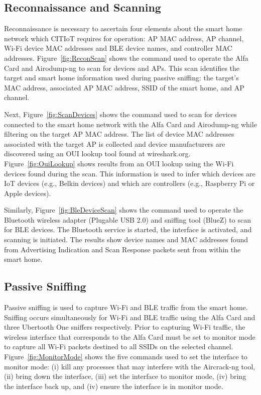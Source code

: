 \documentclass[12pt,letterpaper,oneside]{book}
\begin{document}
		
			\subsection{Reconnaissance and Scanning}
			Reconnaissance is necessary to ascertain four elements about the smart home network which \ac{CITIoT} requires for operation: \ac{AP} \ac{MAC} address, \ac{AP} channel, Wi-Fi device \ac{MAC} addresses and \ac{BLE} device names, and controller \ac{MAC} addresses. Figure~\ref{fig:ReconScan} shows the command used to operate the Alfa Card and Airodump-ng to scan for devices and \ac{AP}s. This scan identifies the target and smart home information used during passive sniffing: the target's \ac{MAC} address, associated \ac{AP} \ac{MAC} address, \ac{SSID} of the smart home, and \ac{AP} channel.
			
			\figReconScan
			
			Next, Figure~\ref{fig:ScanDevices} shows the command used to scan for devices connected to the smart home network with the Alfa Card and Airodump-ng while filtering on the target \ac{AP} \ac{MAC} address. The list of device \ac{MAC} addresses associated with the target \ac{AP} is collected and device manufacturers are discovered using an \ac{OUI} lookup tool found at wireshark.org. Figure~\ref{fig:OuiLookup} shows results from an \ac{OUI} lookup using the Wi-Fi devices found during the scan. This information is used to infer which devices are \ac{IoT} devices (e.g., Belkin devices) and which are controllers (e.g., Raspberry Pi or Apple devices). 
			
			\figScanDevices
			\figOuiLookup
			
			Similarly, Figure~\ref{fig:BleDeviceScan} shows the command used to operate the Bluetooth wireless adapter (Plugable USB 2.0) and sniffing tool (BlueZ) to scan for \ac{BLE} devices. The Bluetooth service is started, the interface is activated, and scanning is initiated. The results show device names and \ac{MAC} addresses found from Advertising Indication and Scan Response packets sent from within the smart home.
			
			\figBleDeviceScan
		
			\subsection{Passive Sniffing}
			Passive sniffing is used to capture Wi-Fi and \ac{BLE} traffic from the smart home. Sniffing occurs simultaneously for Wi-Fi and \ac{BLE} traffic using the Alfa Card and three Ubertooth One sniffers respectively. Prior to capturing Wi-Fi traffic, the wireless interface that corresponds to the Alfa Card must be set to monitor mode to capture all Wi-Fi packets destined to all \ac{SSID}s on the selected channel. Figure~\ref{fig:MonitorMode} shows the five commands used to set the interface to monitor mode: (i) kill any processes that may interfere with the Aircrack-ng tool, (ii) bring down the interface, (iii) set the interface to monitor mode, (iv) bring the interface back up, and (iv) ensure the interface is in monitor mode. 
			
\end{document}
